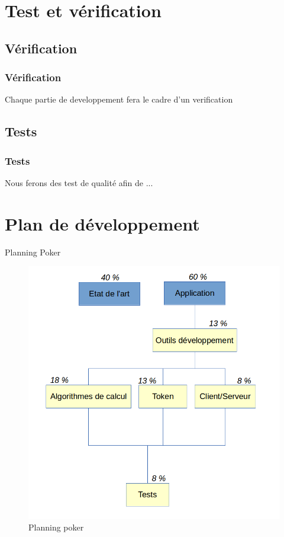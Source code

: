 \documentclass{beamer}
\begin{document}
\section{Test et vérification}

\subsection{Vérification}

\begin{frame}
  \frametitle{Vérification}
  Chaque partie de developpement fera le cadre d'un verification 
\end{frame}

\subsection{Tests}

\begin{frame}
  \frametitle{Tests}
  Nous ferons des test de qualité afin de ...
\end{frame}


\section{Plan de développement}
\begin{frame}
  \begin{block}{Planning Poker}
    \begin{figure}
      \includegraphics[scale=0.1]{img/planningpoker.png} %
      \caption{Planning poker}
    \end{figure}
  \end{block}
\end{frame}
\end{document}
